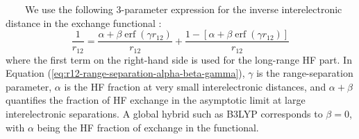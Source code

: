 \documentclass[landscape,a0b,final]{a0poster}
\newcommand{\bindent}{\ \ \ \ }
\newenvironment{poster}{
  \begin{center}
  \begin{minipage}[c]{0.981\textwidth}
}{
  \end{minipage} 
  \end{center}
}
\begin{document}
\begin{poster}
\begin{multicols}{3}
    \bindent We use the following 3-parameter expression for the inverse
    interelectronic distance in the exchange functional
    \cite{yanai_new_2004}:
    \begin{equation}
    \label{eq:r12-range-separation-alpha-beta-gamma}
    \frac{1}{r_{12}} =
    \frac{\alpha + \beta \operatorname{erf} (\gamma r_{12})}{r_{12}} + 
    \frac{1-[\alpha + \beta \operatorname{erf} (\gamma r_{12})]}{r_{12}} 
    \end{equation}
    where the first term on the right-hand side is used for the long-range
    HF part. In Equation (\ref{eq:r12-range-separation-alpha-beta-gamma}),
    $\gamma$ is the range-separation parameter, $\alpha$ is the HF
    fraction at very small interelectronic distances, and $\alpha+\beta$
    quantifies the fraction of HF exchange in the asymptotic limit at
    large interelectronic separations. A global hybrid such as B3LYP
    corresponds to $\beta = 0$, with $\alpha$ being the HF fraction of
    exchange in the functional.


\end{multicols}
\end{poster}
\end{document}
